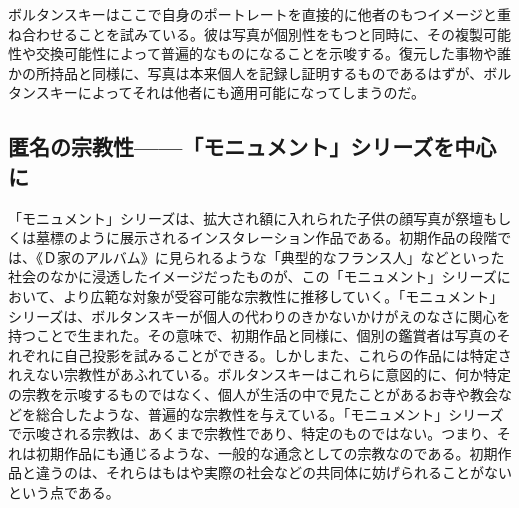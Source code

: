 \documentclass[b5j,twoside,twocolumn]{utarticle}
\begin{document}
ボルタンスキーはここで自身のポートレートを直接的に他者のもつイメージと重ね合わせることを試みている。彼は写真が個別性をもつと同時に、その複製可能性や交換可能性によって普遍的なものになることを示唆する。復元した事物や誰かの所持品と同様に、写真は本来個人を記録し証明するものであるはずが、ボルタンスキーによってそれは他者にも適用可能になってしまうのだ。
\subsection{\tbaselineshift =3.0pt 匿名の宗教性------「モニュメント」シリーズを中心に}
「モニュメント」シリーズは、拡大され額に入れられた子供の顔写真が祭壇もしくは墓標のように展示されるインスタレーション作品である。初期作品の段階では、《Ｄ家のアルバム》に見られるような「典型的なフランス人」などといった社会のなかに浸透したイメージだったものが、この「モニュメント」シリーズにおいて、より広範な対象が受容可能な宗教性に推移していく。「モニュメント」シリーズは、ボルタンスキーが個人の代わりのきかないかけがえのなさに関心を持つことで生まれた。その意味で、初期作品と同様に、個別の鑑賞者は写真のそれぞれに自己投影を試みることができる。しかしまた、これらの作品には特定されえない宗教性があふれている。ボルタンスキーはこれらに意図的に、何か特定の宗教を示唆するものではなく、個人が生活の中で見たことがあるお寺や教会などを総合したような、普遍的な宗教性を与えている。「モニュメント」シリーズで示唆される宗教は、あくまで宗教性であり、特定のものではない。つまり、それは初期作品にも通じるような、一般的な通念としての宗教なのである。初期作品と違うのは、それらはもはや実際の社会などの共同体に妨げられることがないという点である。
\end{document}
